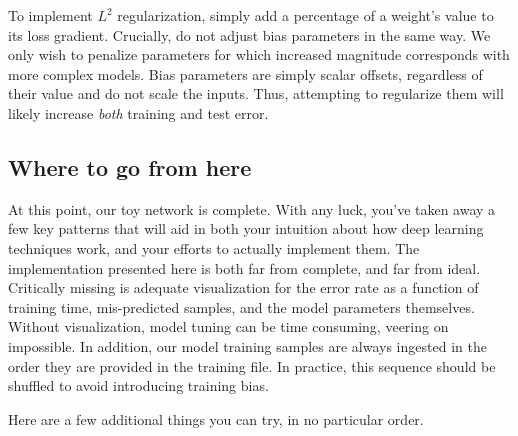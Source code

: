 \documentclass[
]{article}
\begin{document}
To implement \(L^2\) regularization, simply add a percentage of a
weight's value to its loss gradient. Crucially, do not adjust bias
parameters in the same way. We only wish to penalize parameters for
which increased magnitude corresponds with more complex models. Bias
parameters are simply scalar offsets, regardless of their value and do
not scale the inputs. Thus, attempting to regularize them will likely
increase \emph{both} training and test error.

\hypertarget{where-to-go-from-here}{%
\subsection{Where to go from here}\label{where-to-go-from-here}}

At this point, our toy network is complete. With any luck, you've taken
away a few key patterns that will aid in both your intuition about how
deep learning techniques work, and your efforts to actually implement
them. The implementation presented here is both far from complete, and
far from ideal. Critically missing is adequate visualization for the
error rate as a function of training time, mis-predicted samples, and
the model parameters themselves. Without visualization, model tuning can
be time consuming, veering on impossible. In addition, our model
training samples are always ingested in the order they are provided in
the training file. In practice, this sequence should be shuffled to
avoid introducing training bias.

Here are a few additional things you can try, in no particular order.
\end{document}
